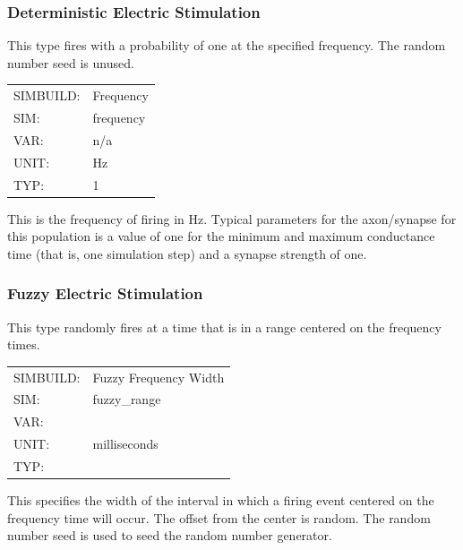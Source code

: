\documentclass[12pt,openany,oneside]{book}
\begin{document}
\subsubsection{Deterministic Electric Stimulation}
\label{Deterministic Electric Stimulation}
This type fires with a probability of one at the specified frequency. The
random number seed is unused.
\begin{flushleft}
\begin{tabular}{@{}ll@{}}
SIMBUILD: & Frequency\\
SIM: & frequency\\
VAR: & n/a\\
UNIT: & Hz\\
TYP: & 1\\
\end{tabular}
\end{flushleft}
\noindent
This is the frequency of firing in Hz. Typical parameters for the
axon/synapse for this population is a value of one for the minimum and maximum 
conductance time (that is, one simulation step) and a synapse strength
of one.
\filbreak
\vspace{\baselineskip}

\subsubsection{Fuzzy Electric Stimulation}
\label{Fuzzy Electric Stimulation}
This type randomly fires at a time that is in a range centered on the
frequency times.

\begin{flushleft}
\begin{tabular}{@{}ll@{}}
SIMBUILD: & Fuzzy Frequency Width\\
SIM: & fuzzy\_range\\
VAR: &\\
UNIT: & milliseconds\\
TYP: &\\
\end{tabular}
\end{flushleft}
\noindent
This specifies the width of the interval in which a firing event centered
on the frequency time will occur. The offset from the center is random.
The random number seed is used to seed the random number generator.



\end{document}
